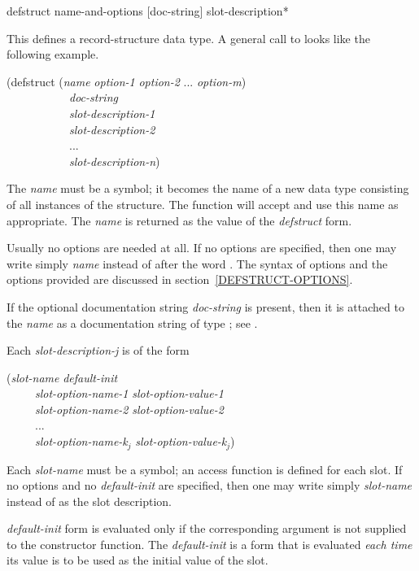 \begin{defmac}
defstruct name-and-options [doc-string] {slot-description}*

This defines a record-structure data type.
A general call to  looks like the following example.
\begin{lisp}
(defstruct (\emph{name} \emph{option-1} \emph{option-2} ... \emph{option-m}) \\
~~~~~~~~~~~\emph{doc-string} \\
~~~~~~~~~~~\emph{slot-description-1} \\
~~~~~~~~~~~\emph{slot-description-2} \\
~~~~~~~~~~~... \\
~~~~~~~~~~~\emph{slot-description-n}) \\
\end{lisp}
The \emph{name} must be a symbol; it becomes the name of a new data type
consisting of all instances of the structure.
The function  will accept and use this name
as appropriate.  The \emph{name} is returned as the value of the \emph{defstruct}
form.

Usually no options are needed at all.
If no options are specified, then one may write simply \emph{name} instead
of  after the word .  The syntax of options
and the options provided are discussed in section~\ref{DEFSTRUCT-OPTIONS}.

If the optional documentation string \emph{doc-string} is present,
then it is attached to the \emph{name}
as a documentation string of type ; see .

Each \emph{slot-description-j} is of the form
\begin{lisp}
(\emph{slot-name} \emph{default-init} \\
~~~~~\emph{slot-option-name-1} \emph{slot-option-value-1} \\
~~~~~\emph{slot-option-name-2} \emph{slot-option-value-2} \\
~~~~~... \\
~~~~~\emph{slot-option-name-k${}_{j}$} \emph{slot-option-value-k${}_{j}$})
\end{lisp}
Each \emph{slot-name} must be a symbol; an access function is defined
for each slot. If no options and no \emph{default-init} are specified,
then one may write simply \emph{slot-name} instead of 
as the slot description.

\emph{default-init} form is evaluated only if the corresponding
argument is not supplied to the constructor function. 
The \emph{default-init} is a form that is
evaluated \emph{each time} its value
is to be used as the initial value of the slot.


\end{defmac}
